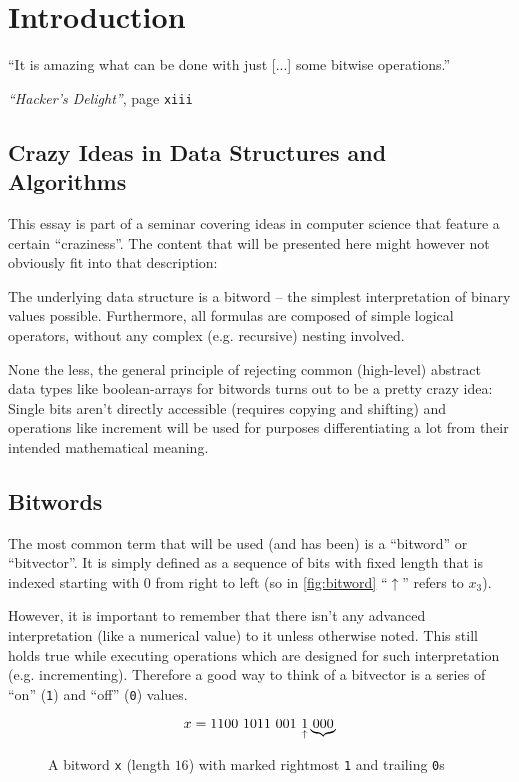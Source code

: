 \section{Introduction}\label{sec:introduction}
\epigraph{
``It is amazing what can be done
with just [...] some bitwise operations.''
}{
\emph{``Hacker's Delight''}, page \texttt{xiii}
\cite{Warren:2012:HD:2462741}
}


\subsection*{Crazy Ideas in Data Structures and Algorithms}
This essay is part of a seminar covering
ideas in computer science that feature a certain ``craziness''.
The content that will be presented here
might however not obviously fit into that description:

The underlying data structure is a bitword
-- the simplest interpretation of binary values possible.
Furthermore, all formulas are composed of simple logical operators,
without any complex (e.g. recursive) nesting involved.

None the less, the general principle of rejecting
common (high-level) abstract data types like boolean-arrays
for bitwords turns out to be a pretty crazy idea:
Single bits aren't directly accessible (requires copying and shifting)
and operations like increment will be used for
purposes differentiating a lot from their intended mathematical meaning.


\subsection*{Bitwords}
The most common term that will be used (and has been)
is a ``bitword'' or ``bitvector''.
It is simply defined as a sequence of bits with fixed length
that is indexed starting with $0$ from right to left
(so in \autoref{fig:bitword} ``$\uparrow$'' refers to $x_3$).

However, it is important to remember that
there isn't any advanced interpretation (like a numerical value) to it
unless otherwise noted.
This still holds true while executing operations
which are designed for such interpretation (e.g. incrementing).
Therefore a good way to think of a bitvector
is a series of ``on'' (\lstinline$1$) and ``off'' (\lstinline$0$) values.

\begin{figure}[h]
\[
x = \lstinline$1100 1011 001 $
\underset{\uparrow}{\lstinline$1$}
\underbrace{\lstinline$000$}
\]
\caption{
A bitword \lstinline$x$ (length $16$)
with marked rightmost \lstinline$1$ and trailing \lstinline$0$s
}
\label{fig:bitword}
\end{figure}

